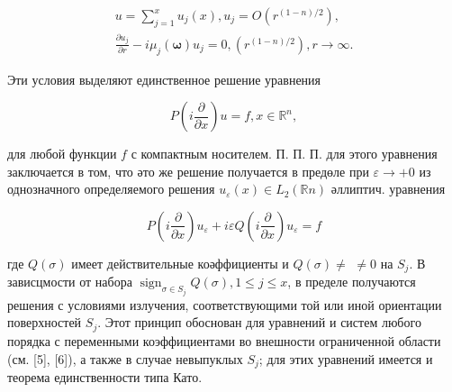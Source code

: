 \documentclass[10pt]{article}
\begin{document}
\[

\begin{gathered}

u=\sum_{j=1}^{x} u_{j}(x), u_{j}=O\left(r^{(1-n) / 2}\right), \\

\frac{\partial u_{j}}{\partial r}-i \mu_{j}(\boldsymbol{\omega}) u_{j}=0,\left(r^{(1-n) / 2}\right), r \rightarrow \infty .

\end{gathered}

\]



Эти условия выделяют единственное решение уравнения



\[

P\left(i \frac{\partial}{\partial x}\right) u=f, x \in \mathbb{R}^{n},

\]



для любой функции $f$ с компактным носителем. П. П. П. для этого уравнения заключается в том, что әто же решение получается в предөле при $\varepsilon \rightarrow+0$ из однозначного определяемого решения $u_{\varepsilon}(x) \in L_{2}(\mathbb{R} n)$ әллиптич. уравнения



\[

P\left(i \frac{\partial}{\partial x}\right) u_{\varepsilon}+i \varepsilon Q\left(i \frac{\partial}{\partial x}\right) u_{\varepsilon}=f

\]



где $Q(\sigma)$ имеет действительные коәффициенты и $Q(\sigma) \neq$ $\neq 0$ на $S_{j}$. В зависцмости от набора $\operatorname{sign}_{\sigma \in S_{j}} Q(\sigma), 1 \leqslant j \leqslant x$, в пределе получаются решения с условиями излучения, соответствующими той или иной ориентации поверхностей $S_{j}$. Этот принцип обоснован для уравнений и систем любого порядка с переменными коэффициентами во внешности ограниченной области (см. [5], [6]), а также в случае невыпуклых $S_{j}$; для этих уравнений имеется и теорема единственности типа Като.
\end{document}
